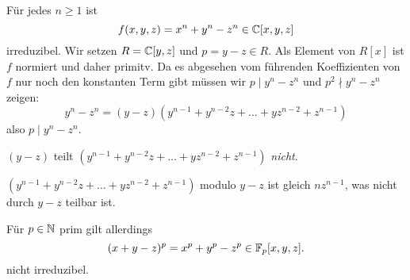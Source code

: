 \begin{eg}
	Für jedes $n \geq 1$ ist 
	\[
		f(x,y,z) = x^{n} + y^{n} - z^{n} \in \mathbb{C}[x,y,z]
	\] 
	irreduzibel.
	Wir setzen $R = \mathbb{C}[y,z]$ und $p = y-z \in R$.
	Als Element von $R[x]$ ist $f$ normiert und daher primitv.
	Da es abgesehen vom führenden Koeffizienten von $f$ nur noch den konstanten Term gibt müssen wir $p \mid y^{n} - z^{n}$ und $p^2 \nmid y^{n} - z^{n}$ zeigen:
	\[
		y^{n} - z^{n} = (y-z)(y^{n-1} + y^{n-2} z + \ldots + y z ^{n-2} + z^{n-1})
	\] 
	also $p \mid y^{n} - z^{n}$.
	\begin{claim}
		$(y-z)$ teilt $(y^{n-1} + y^{n-2} z + \ldots + y z ^{n-2} + z^{n-1})$ \emph{nicht}.
	\end{claim}
	$(y^{n-1} + y^{n-2} z + \ldots + y z ^{n-2} + z^{n-1})$ modulo  $y-z$ ist gleich $n z^{n-1}$, was nicht durch $y-z$ teilbar ist.
\end{eg}

\begin{remark}
	Für $p \in \mathbb{N}$ prim gilt allerdings
	\[
		(x+y-z)^{p} = x^{p} + y^{p} - z^{p} \in \mathbb{F}_{p}[x,y,z]
	.\]
	nicht irreduzibel.
\end{remark}


















